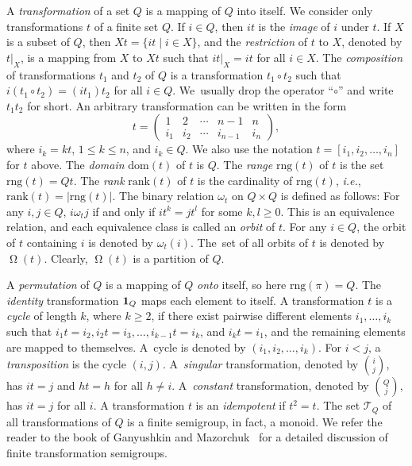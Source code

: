 \documentclass{llncs}
\renewcommand{\le}{\leqslant}
\renewcommand{\ge}{\geqslant}
\newcommand{\ie}{\mbox{\it i.e.}}
\newcommand{\trng}{\mathrm{rng}}
\newcommand{\tdom}{\mathrm{dom}}
\newcommand{\trank}{\mathrm{rank}}
\newcommand{\tid}{\mbox{{\bf 1}}}
\newcommand{\cT}{{\mathcal T}}
\DeclareMathOperator{\Orbit}{\Omega}
\begin{document}
A {\em transformation} of a set $Q$ is a mapping of $Q$ into itself. We consider only transformations $t$ of a finite set $Q$. If  $i \in Q$, then $it$ is the {\it image} of $i$ under $t$.  If $X$ is a subset of $Q$, then $Xt = \{it \mid i \in X\}$, and the {\em restriction} of $t$ to $X$, denoted by $t|_X$, is a mapping from $X$ to $Xt$ such that $it|_X = it$ for all $i \in X$. The {\em composition} of  transformations $t_1$ and $t_2$ of $Q$ is a transformation $t_1 \circ t_2$ such that $i (t_1 \circ t_2) = (i t_1) t_2$ for all $i \in Q$. We~usually drop the  operator ``$\circ$'' and write $t_1t_2$ for short. 
An arbitrary transformation can be written in the form
\begin{equation*}\label{eq:transmatrix}
t=\left( \begin{array}{ccccc}
1 & 2 &   \cdots &  n-1 & n \\
i_1 & i_2 &   \cdots &  i_{n-1} & i_n
\end{array} \right ),
\end{equation*}
where $i_k = kt$,  $1\le k\le n$, and $i_k\in Q$. We also use the notation $t = [i_1,i_2,\ldots,i_n]$ for $t$ above. The {\em domain} $\tdom(t)$ of $t$ is $Q.$
The {\em range} $\trng(t)$ of $t$ is the set $\trng(t) = Q t.$ The \emph{rank} $\trank(t)$ of $t$ is the cardinality of $\trng(t)$, \ie, $\trank(t) = |\trng(t)|$. The binary relation $\omega_t$ on $Q \times Q$ is defined as follows: For any $i, j \in Q$, $i \mathbin{\omega_t} j$ if and only if $it^k = jt^l$ for some $k, l \ge 0$. This is an equivalence relation, and each equivalence class is called an \emph{orbit} of $t$. For any $i \in Q$, the orbit of $t$ containing $i$ is denoted by $\omega_t(i)$. The~set of all orbits of $t$ is denoted by $\Orbit(t)$. Clearly, $\Orbit(t)$ is a partition of $Q$. 

A \emph{permutation} of $Q$ is a mapping of $Q$ \emph{onto} itself, so here $\trng(\pi) = Q$. 
The \emph{identity} transformation $\tid_Q$ maps each element to itself. 
A transformation $t$ is a \emph{cycle} of length $k$, where $k \ge 2$, if there exist pairwise different elements $i_1,\ldots,i_k$ such that
$i_1t=i_2, i_2t=i_3,\ldots, i_{k-1}t=i_k$, and $i_kt=i_1$, and the remaining elements are mapped to themselves.
A~cycle is denoted by $(i_1,i_2,\ldots,i_k)$.
For $i<j$, a \emph{transposition} is the cycle $(i,j)$.
A~\emph{singular} transformation, denoted by $i\choose j$, has $it=j$ and $ht=h$ for all $h\neq i$.
A~\emph{constant} transformation,  denoted by $Q \choose j$, has $it=j$ for all $i$.
A transformation $t$  is an \emph{idempotent} if $t^2 = t$.
The set $\cT_Q$ of all transformations of $Q$ is a finite semigroup, in fact, a monoid. We refer the reader to the book of Ganyushkin and Mazorchuk~\cite{GaMa09} for a detailed discussion of finite transformation semigroups. 
\end{document}
